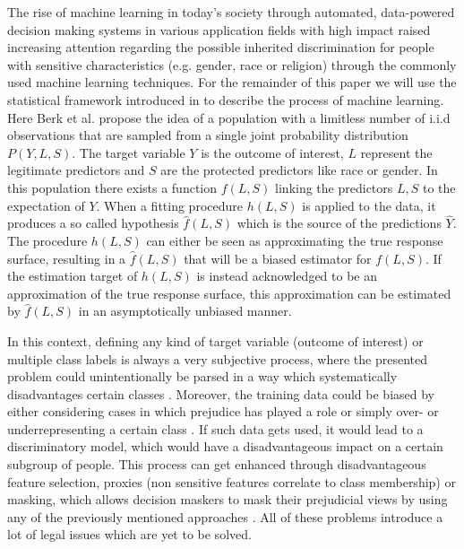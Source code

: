 The rise of machine learning in today's society through automated, data-powered decision making 
systems in various application fields with high impact raised increasing attention regarding the 
possible inherited discrimination for people with sensitive characteristics (e.g. gender, race or 
religion) through the commonly used machine learning techniques. For the remainder of this paper we will use the statistical framework introduced in 
\cite{Berk.2018} to describe the process of machine learning. Here Berk et al. propose the idea of 
a population with a limitless number of i.i.d observations that are sampled from a single joint 
probability distribution $P(Y,L,S)$. 
The target variable $Y$ is the outcome of interest, $L$ represent the legitimate predictors and $S$ are the 
protected predictors like race or gender. In this population there exists a function $f(L,S)$ 
linking the predictors $L,S$ to the expectation of $Y$. When a fitting procedure $h(L,S)$ 
is applied to the data, it produces a so called hypothesis $\hat{f}(L,S)$ which is the 
source of the predictions $\hat{Y}$. The procedure $h(L,S)$ can either be seen as 
approximating the true response surface, resulting in a $\hat{f}(L,S)$ that will be a biased 
estimator for $f(L,S)$. If the estimation target of $h(L,S)$ is instead acknowledged to be 
an approximation of the true response surface, this approximation can be estimated by 
$\hat{f}(L,S)$ in an asymptotically unbiased manner.

In this context, defining any kind of target variable (outcome of interest) or multiple class labels 
is always a very subjective process, where the presented problem could unintentionally be parsed in a 
way which systematically disadvantages certain classes \cite{Barocas.2016, barocas-hardt-narayanan}. 
Moreover, the training data could be biased by either considering cases in which prejudice has played 
a role or simply over- or underrepresenting a certain class \cite{Barocas.2016, barocas-hardt-narayanan}. 
If such data gets used, it would lead to a discriminatory model, which would have a disadvantageous 
impact on a certain subgroup of people. This process can get enhanced through disadvantageous feature 
selection, proxies (non sensitive features correlate to class membership) or masking, which allows 
decision maskers to mask their prejudicial views by using any of the previously mentioned approaches 
\cite{Barocas.2016, barocas-hardt-narayanan}. All of these problems introduce a lot of legal issues 
which are yet to be solved. 